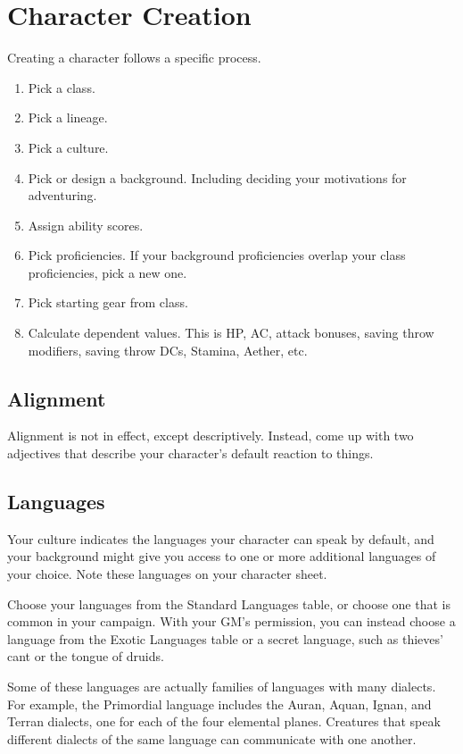 \chapter{Character Creation}
\label{ch:character-creation}
Creating a character follows a specific process.
\begin{enumerate}
    \item Pick a class.
    \item Pick a lineage.
    \item Pick a culture.
    \item Pick or design a background. Including deciding your motivations for adventuring.
    \item Assign ability scores.
    \item Pick proficiencies. If your background proficiencies overlap your class proficiencies, pick a new one.
    \item Pick starting gear from class.
    \item Calculate dependent values. This is HP, AC, attack bonuses, saving throw modifiers, saving throw DCs, Stamina, Aether, etc.
\end{enumerate}
\section{Alignment}
\label{sec:alignment}
Alignment is not in effect, except descriptively. Instead, come up with two adjectives that describe your character's default reaction to things. 

\section{Languages}
\label{sec:languages}
Your culture indicates the languages your character can speak by default, and your background might give you access to one or more additional languages of your choice. Note these languages on your character sheet.

Choose your languages from the Standard Languages table, or choose one that is common in your campaign. With your GM's permission, you can instead choose a language from the Exotic Languages table or a secret language, such as thieves' cant or the tongue of druids.

Some of these languages are actually families of languages with many dialects. For example, the Primordial language includes the Auran, Aquan, Ignan, and Terran dialects, one for each of the four elemental planes. Creatures that speak different dialects of the same language can communicate with one another.

